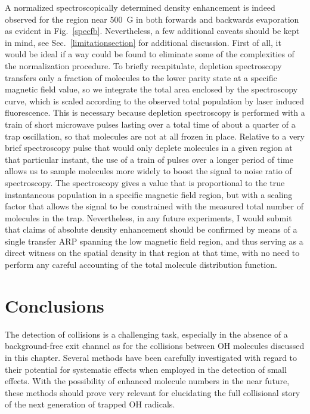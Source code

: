 A normalized spectroscopically determined density enhancement is indeed observed for the region near $500$~G in both forwards and backwards evaporation as evident in Fig.~\ref{specfb}.
Nevertheless, a few additional caveats should be kept in mind, see Sec.~\ref{limitationsection} for additional discussion.
First of all, it would be ideal if a way could be found to eliminate some of the complexities of the normalization procedure.
To briefly recapitulate, depletion spectroscopy transfers only a fraction of molecules to the lower parity state at a specific magnetic field value, so we integrate the total area enclosed by the spectroscopy curve, which is scaled according to the observed total population by laser induced fluorescence.  
This is necessary because depletion spectroscopy is performed with a train of short microwave pulses lasting over a total time of about a quarter of a trap oscillation, so that molecules are not at all frozen in place. 
Relative to a very brief spectroscopy pulse that would only deplete molecules in a given region at that particular instant, the use of a train of pulses over a longer period of time allows us to sample molecules more widely to boost the signal to noise ratio of spectroscopy. 
The spectroscopy gives a value that is proportional to the true instantaneous population in a specific magnetic field region, but with a scaling factor that allows the signal to be constrained with the measured total number of molecules in the trap.
Nevertheless, in any future experiments, I would submit that claims of absolute density enhancement should be confirmed by means of a single transfer ARP spanning the low magnetic field region, and thus serving as a direct witness on the spatial density in that region at that time, with no need to perform any careful accounting of the total molecule distribution function.

\section{Conclusions}

The detection of collisions is a challenging task, especially in the absence of a background-free exit channel as for the collisions between OH molecules discussed in this chapter.
Several methods have been carefully investigated with regard to their potential for systematic effects when employed in the detection of small effects.
With the possibility of enhanced molecule numbers in the near future, these methods should prove very relevant for elucidating the full collisional story of the next generation of trapped OH radicals.


\ifx\justbeingincluded\undefined

\fi
